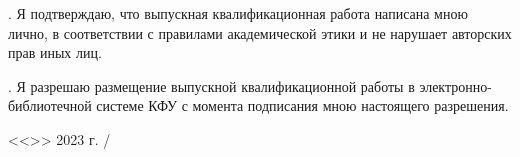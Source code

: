 \documentclass[a4paper,article]{article}
\begin{document}
\begin{sloppypar}
    . Я подтверждаю, что выпускная квалификационная работа написана мною лично, в соответствии с правилами академической этики и не нарушает авторских прав иных лиц. \newline
    
    . Я разрешаю размещение выпускной квалификационной работы в электронно-библиотечной системе КФУ с момента подписания мною настоящего разрешения.
    
    \vfill
    
    \noindent
    <<\underline{\hspace{1cm}}>>\underline{\hspace{3cm}} 2023 г. \hfill \underline{\hspace{3cm}}/\underline{\hspace{3cm}}
\end{sloppypar}
\end{document}
